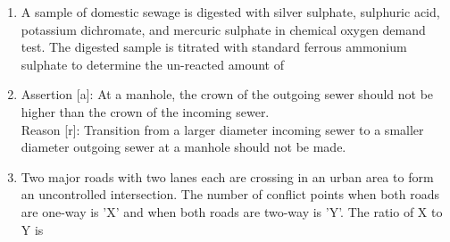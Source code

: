 \documentclass[journal]{IEEEtran}
\begin{document}
\begin{enumerate}
\item A sample of domestic sewage is digested with silver sulphate, sulphuric acid, potassium dichromate, and mercuric sulphate in chemical oxygen demand  test. The digested sample is titrated with standard ferrous ammonium sulphate  to determine the un-reacted amount of \hfill {}
\begin{enumerate}
\end{enumerate}

\item Assertion [a]: At a manhole, the crown of the outgoing sewer should not be higher than the crown of the incoming sewer. \\
Reason [r]: Transition from a larger diameter incoming sewer to a smaller diameter outgoing sewer at a manhole should not be made. \hfill {}
\begin{enumerate}
\end{enumerate}

\item Two major roads with two lanes each are crossing in an urban area to form an uncontrolled intersection. The number of conflict points when both roads are one-way is 'X' and when both roads are two-way is 'Y'. The ratio of X to Y is \hfill {}
\begin{enumerate}
\end{enumerate}


\end{enumerate}
\end{document}
